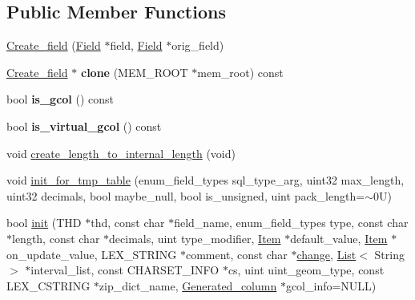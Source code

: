 \subsection*{Public Member Functions}
\begin{DoxyCompactItemize}
\item 
\mbox{\hyperlink{classCreate__field_a9b04b8a7ff95d34b23212320d24cc06e}{Create\+\_\+field}} (\mbox{\hyperlink{classField}{Field}} $\ast$field, \mbox{\hyperlink{classField}{Field}} $\ast$orig\+\_\+field)
\item 
\mbox{\label{classCreate__field_abaf3abe56a57e8e9c5607516409932dc}} 
\mbox{\hyperlink{classCreate__field}{Create\+\_\+field}} $\ast$ {\bfseries clone} (M\+E\+M\+\_\+\+R\+O\+OT $\ast$mem\+\_\+root) const
\item 
\mbox{\label{classCreate__field_a8ff27d72570b8790d8547358288e0c38}} 
bool {\bfseries is\+\_\+gcol} () const
\item 
\mbox{\label{classCreate__field_a65974310743a9fe9eb1ae5924b99d534}} 
bool {\bfseries is\+\_\+virtual\+\_\+gcol} () const
\item 
void \mbox{\hyperlink{classCreate__field_a19af2570fa554626f604637ad2a98894}{create\+\_\+length\+\_\+to\+\_\+internal\+\_\+length}} (void)
\item 
void \mbox{\hyperlink{classCreate__field_ac65e50b2515b9ab1f50430f152d889e0}{init\+\_\+for\+\_\+tmp\+\_\+table}} (enum\+\_\+field\+\_\+types sql\+\_\+type\+\_\+arg, uint32 max\+\_\+length, uint32 decimals, bool maybe\+\_\+null, bool is\+\_\+unsigned, uint pack\+\_\+length=$\sim$0\+U)
\item 
bool \mbox{\hyperlink{classCreate__field_a14a438364919ba717a312097a0ae164c}{init}} (T\+HD $\ast$thd, const char $\ast$field\+\_\+name, enum\+\_\+field\+\_\+types type, const char $\ast$length, const char $\ast$decimals, uint type\+\_\+modifier, \mbox{\hyperlink{classItem}{Item}} $\ast$default\+\_\+value, \mbox{\hyperlink{classItem}{Item}} $\ast$on\+\_\+update\+\_\+value, L\+E\+X\+\_\+\+S\+T\+R\+I\+NG $\ast$comment, const char $\ast$\mbox{\hyperlink{classCreate__field_a03e21b16d55606529d6a56b7639acb0f}{change}}, \mbox{\hyperlink{classList}{List}}$<$ String $>$ $\ast$interval\+\_\+list, const C\+H\+A\+R\+S\+E\+T\+\_\+\+I\+N\+FO $\ast$cs, uint uint\+\_\+geom\+\_\+type, const L\+E\+X\+\_\+\+C\+S\+T\+R\+I\+NG $\ast$zip\+\_\+dict\+\_\+name, \mbox{\hyperlink{classGenerated__column}{Generated\+\_\+column}} $\ast$gcol\+\_\+info=N\+U\+LL)

\end{DoxyCompactItemize}
